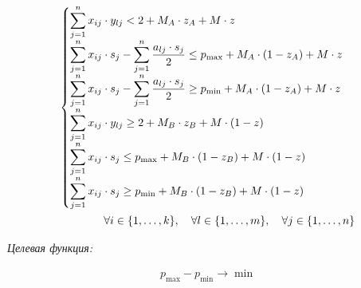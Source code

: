 \documentclass[14pt,fleqn]{extarticle}
\begin{document}
	\begin{ceqn}
	\begin{align*}
		\begin{cases}
			\smashoperator[r]{\sum_{j=1}^{n}} x_{ij} \cdot y_{lj} < 2 + M_A \cdot z_A + M \cdot z\\
			\smashoperator[r]{\sum_{j=1}^{n}} x_{ij} \cdot s_j - \smashoperator[r]{\sum_{j=1}^{n}} \dfrac{a_{lj} \cdot s_j}{2} \leq p_{\max} +  M_A \cdot (1 - z_A) + M \cdot z\\
			\smashoperator[r]{\sum_{j=1}^{n}} x_{ij} \cdot s_j - \smashoperator[r]{\sum_{j=1}^{n}} \dfrac{a_{lj} \cdot s_j}{2} \geq p_{\min} +  M_A \cdot (1 - z_A) + M \cdot z\\
			\smashoperator[r]{\sum_{j=1}^{n}} x_{ij} \cdot y_{lj} \geq 2 + M_B \cdot z_B + M \cdot (1-z)\\
			\smashoperator[r]{\sum_{j=1}^{n}} x_{ij} \cdot s_j \leq p_{\max} +  M_B \cdot (1 - z_B) + M \cdot (1-z)\\
			\smashoperator[r]{\sum_{j=1}^{n}} x_{ij} \cdot s_j \geq p_{\min} + M_B \cdot (1 - z_B) + M \cdot (1-z)\\
		\end{cases}\\
		\forall i \in \{1, \dots, k\}, \quad \forall l \in \{1, \dots, m\}, \quad \forall j \in \{1, \dots, n\}
	\end{align*}
	\end{ceqn}
	
	\newpage
	
	\textit{Целевая функция:}
	\begin{ceqn}
		\begin{align*}
			p_{\max} - p_{\min} \longrightarrow \min
		\end{align*}
	\end{ceqn}
\end{document}

